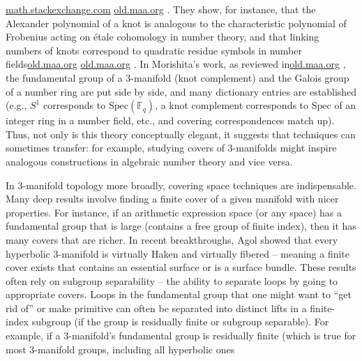 \documentclass[11pt]{article}
\theoremstyle{remark}
\begin{document}
\href{https://math.stackexchange.com/questions/38936/analogies-between-prime-ideals-and-knots#:~:text=,between%20prime%20ideals%20and%20knots}{math.stackexchange.com}
\href{https://old.maa.org/press/maa-reviews/knots-and-primes-an-introduction-to-arithmetic-topology#:~:text=All%20right%2C%20then%2C%20what%20does,manifolds%20and%20%E2%80%9Cnumber%20rings.%E2%80%9D}{old.maa.org}
. They show, for instance, that the Alexander polynomial of a knot is analogous to the characteristic polynomial of Frobenius acting on étale cohomology in number theory, and that linking numbers of knots correspond to quadratic residue symbols in number fields\href{https://old.maa.org/press/maa-reviews/knots-and-primes-an-introduction-to-arithmetic-topology#:~:text=Morishita%20emphatically%20takes%20this%20position,there%20is%20indeed%20a%20close}{old.maa.org}
\href{https://old.maa.org/press/maa-reviews/knots-and-primes-an-introduction-to-arithmetic-topology#:~:text=All%20right%2C%20then%2C%20what%20does,manifolds%20and%20%E2%80%9Cnumber%20rings.%E2%80%9D}{old.maa.org}
. In Morishita’s work, as reviewed in\href{https://old.maa.org/press/maa-reviews/knots-and-primes-an-introduction-to-arithmetic-topology#:~:text=All%20right%2C%20then%2C%20what%20does,manifolds%20and%20%E2%80%9Cnumber%20rings.%E2%80%9D}{old.maa.org}
, the fundamental group of a 3-manifold (knot complement) and the Galois group of a number ring are put side by side, and many dictionary entries are established (e.g., $S^1$ corresponds to $\mathrm{Spec}(\mathbb{F}_q)$, a knot complement corresponds to $\mathrm{Spec}$ of an integer ring in a number field, etc., and covering correspondences match up). Thus, not only is this theory conceptually elegant, it suggests that techniques can sometimes transfer: for example, studying covers of 3-manifolds might inspire analogous constructions in algebraic number theory and vice versa.

In 3-manifold topology more broadly, covering space techniques are indispensable. Many deep results involve finding a finite cover of a given manifold with nicer properties. For instance, if an arithmetic expression space (or any space) has a fundamental group that is large (contains a free group of finite index), then it has many covers that are richer. In recent breakthroughs, Agol showed that every hyperbolic 3-manifold is virtually Haken and virtually fibered – meaning a finite cover exists that contains an essential surface or is a surface bundle. These results often rely on subgroup separability – the ability to separate loops by going to appropriate covers. Loops in the fundamental group that one might want to “get rid of” or make primitive can often be separated into distinct lifts in a finite-index subgroup (if the group is residually finite or subgroup separable). For example, if a 3-manifold’s fundamental group is residually finite (which is true for most 3-manifold groups, including all hyperbolic ones
\end{document}
